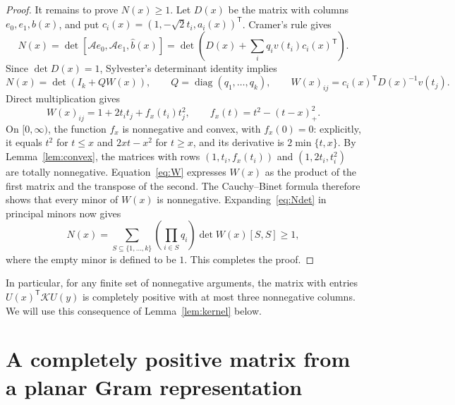 \documentclass[11pt]{article}
\theoremstyle{remark}
\DeclareMathOperator{\diag}{diag}
\begin{document}
\begin{proof}
It remains to prove $N(x)\ge1$.
Let $D(x)$ be the matrix with columns $e_0,e_1,b(x)$, and put
$c_i(x)=(1,-\sqrt2t_i,a_i(x))^{\mathsf T}$.
Cramer's rule gives
\[
 N(x)=\det[\mathcal A e_0,\mathcal A e_1,\widehat b(x)]
     =\det\left(D(x)+\sum_iq_iv(t_i)c_i(x)^{\mathsf T}\right).
\]
Since $\det D(x)=1$, Sylvester's determinant identity implies
\begin{equation}\label{eq:Ndet}
 N(x)=\det(I_k+QW(x)),\qquad
 Q=\diag(q_1,\ldots,q_k),\qquad
 W(x)_{ij}=c_i(x)^{\mathsf T}D(x)^{-1}v(t_j).
\end{equation}
Direct multiplication gives
\begin{equation}\label{eq:W}
 W(x)_{ij}=1+2t_it_j+f_x(t_i)t_j^2,\qquad
 f_x(t)=t^2-(t-x)_+^2.
\end{equation}
On $[0,\infty)$, the function $f_x$ is nonnegative and convex, with
$f_x(0)=0$: explicitly, it equals $t^2$ for $t\le x$ and $2xt-x^2$ for
$t\ge x$, and its derivative is $2\min\{t,x\}$.
By Lemma~\ref{lem:convex}, the matrices with rows
$(1,t_i,f_x(t_i))$ and $(1,2t_i,t_i^2)$ are totally nonnegative.
Equation~\eqref{eq:W} expresses $W(x)$ as the product of the first matrix
and the transpose of the second. The Cauchy--Binet formula therefore shows
that every minor of $W(x)$ is nonnegative.
Expanding~\eqref{eq:Ndet} in principal minors now gives
\[
 N(x)=\sum_{S\subseteq\{1,\ldots,k\}}
       \left(\prod_{i\in S}q_i\right)\det W(x)[S,S]\ge1,
\]
where the empty minor is defined to be $1$.
This completes the proof.
\end{proof}

In particular, for any finite set of nonnegative arguments, the matrix with
entries $U(x)^{\mathsf T}\mathcal K U(y)$ is completely positive with at most
three nonnegative columns. We will use this consequence of
Lemma~\ref{lem:kernel} below.

\section{A completely positive matrix from a planar Gram representation}
\label{sec:matrix}
\end{document}
